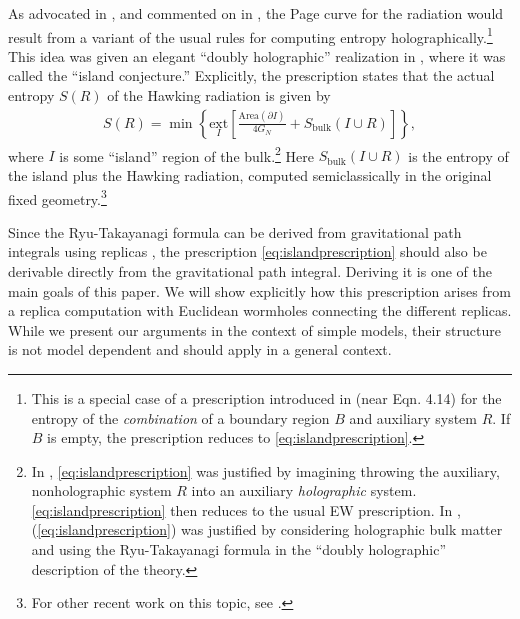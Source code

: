 \documentclass[11pt]{article}
\numberwithin{equation}{section}
\begin{document}
As advocated in \cite{Penington:2019npb}, and commented on in \cite{Almheiri:2019psf}, the Page curve for the radiation would result from a variant of the usual rules for computing entropy holographically.\footnote{This is a special case of a prescription introduced in \cite{Hayden:2018khn} (near Eqn. 4.14) for the entropy of the \emph{combination} of a boundary region $B$ and auxiliary system $R$. If $B$ is empty, the prescription reduces to \eqref{eq:islandprescription}.} This idea was given an elegant ``doubly holographic'' realization in \cite{Almheiri:2019hni}, where it was called the ``island conjecture.''  Explicitly, the prescription states that the actual entropy $S(R)$ of the Hawking radiation is given by
\begin{align} \label{eq:islandprescription}
S(R) = \min \left\{\underset{I}{\text{ext}} \left[\frac{\text{Area}(\partial I)}{4 G_N} + S_\text{bulk}(I \cup R)\right]\right\},
\end{align}
where $I$ is some ``island'' region of the bulk.\footnote{In \cite{Hayden:2018khn,Penington:2019npb}, \eqref{eq:islandprescription} was justified by imagining throwing the auxiliary, nonholographic system $R$ into an auxiliary \emph{holographic} system. \eqref{eq:islandprescription} then reduces to the usual EW prescription. In \cite{Almheiri:2019hni}, (\ref{eq:islandprescription}) was justified by considering holographic bulk matter and using the Ryu-Takayanagi formula in the ``doubly holographic'' description of the theory.} Here $S_\text{bulk}(I\cup R)$ is the entropy of the island plus the Hawking radiation, computed semiclassically in the original fixed geometry.\footnote{For other recent work on this topic, see \cite{Akers:2019nfi,Almheiri:2019yqk,Rozali:2019day,Chen:2019uhq,Bousso:2019ykv,Almheiri:2019psy}.} %


Since the Ryu-Takayanagi formula can be derived from gravitational path integrals using replicas \cite{Lewkowycz:2013nqa,Faulkner:2013ana,Dong:2016hjy,Dong:2017xht}, the prescription \eqref{eq:islandprescription} should also be derivable directly from the gravitational path integral. Deriving it is one of the main goals of this paper. We will show explicitly how this prescription arises from a replica computation with Euclidean wormholes connecting the different replicas.   While we present our arguments in the context of simple models, their structure is not model dependent and should apply in a general context.
\end{document}
